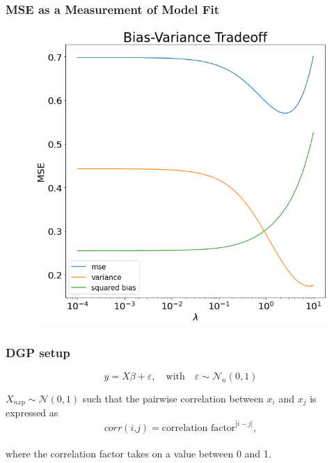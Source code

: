 \begin{frame}[fragile]
\frametitle{MSE as a Measurement of Model Fit}
    \begin{figure}[b]
        \includegraphics[scale=0.30]{Img/bias_var_tradeoff.png}%
        \centering
    \end{figure}
\end{frame}
\begin{frame}[fragile]
    \frametitle{DGP setup}
        $$
        y= X\beta + \varepsilon, \quad \text{with} \quad \varepsilon \sim \mathcal{N}_{n}(0, 1)
        $$

        $\textstyle X_{nxp} \sim \mathcal{N}(0, 1)$ such that the pairwise correlation between $x_{i}$ and $x_{j}$ is expressed as \\ 
        
        $$
        corr(\textit{i,j}) = \text{correlation factor} ^ \left|{i - j}\right|,
        $$\\ 
        
        where the correlation factor takes on a value between 0 and 1.
\end{frame}

